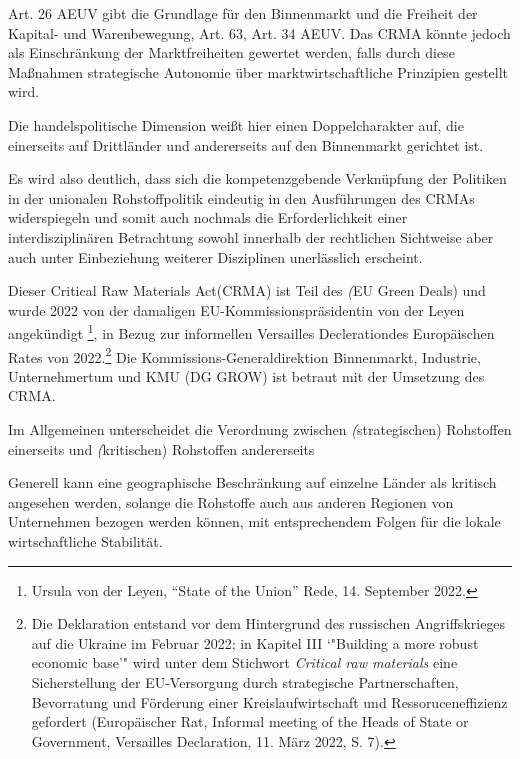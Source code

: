 \documentclass[12pt,a4paper,oneside]{book} %
\begin{document}
	 Art. 26 AEUV gibt die Grundlage für den Binnenmarkt und die Freiheit der Kapital- und Warenbewegung, Art. 63, Art. 34 AEUV. Das CRMA könnte jedoch als Einschränkung der Marktfreiheiten gewertet werden, falls durch diese Maßnahmen strategische Autonomie über marktwirtschaftliche Prinzipien gestellt wird.
	
	
	Die handelspolitische Dimension weißt hier einen Doppelcharakter auf, die einerseits auf Drittländer und andererseits auf den Binnenmarkt gerichtet ist.\autocite{Paschke, Rdtw 2024, 206, 211f}
	
	
	Es wird also deutlich, dass sich die kompetenzgebende Verknüpfung der Politiken in der unionalen Rohstoffpolitik eindeutig in den Ausführungen des CRMAs widerspiegeln und somit auch nochmals die Erforderlichkeit einer interdisziplinären Betrachtung sowohl innerhalb der rechtlichen Sichtweise aber auch unter Einbeziehung weiterer Disziplinen unerlässlich erscheint. 
	
	
	Dieser \glqq Critical Raw Materials Act\grqq (CRMA) ist Teil des \textit(EU Green Deals) und wurde 2022 von der damaligen EU-Kommissionspräsidentin von der Leyen angekündigt \footnote{Ursula von der Leyen, "`State of the Union"' Rede, 14. September 2022.}, in Bezug zur informellen \glqq Versailles Decleration\grqq des Europäischen Rates von 2022.\footnote{Die Deklaration entstand vor dem Hintergrund des russischen Angriffskrieges auf die Ukraine im Februar 2022; in Kapitel III `"Building a more robust economic base'" wird unter dem Stichwort \textit{Critical raw materials} eine Sicherstellung der EU-Versorgung durch strategische Partnerschaften, Bevorratung und Förderung einer Kreislaufwirtschaft und Ressoruceneffizienz gefordert (Europäischer Rat, Informal meeting of the Heads of State or Government, Versailles Declaration, 11. März 2022, S. 7).} Die Kommissions-Generaldirektion Binnenmarkt, Industrie, Unternehmertum und KMU (DG GROW) ist betraut mit der Umsetzung des CRMA.
	
	Im Allgemeinen unterscheidet die Verordnung zwischen \textit(strategischen) Rohstoffen einerseits und \textit(kritischen) Rohstoffen andererseits
	
	Generell kann eine geographische Beschränkung auf einzelne Länder als kritisch angesehen werden, solange die Rohstoffe auch aus anderen Regionen von Unternehmen bezogen werden können, mit entsprechendem Folgen für die lokale wirtschaftliche Stabilität.\autocite[s. hierzu]{ruettinger_doddfrank_2015}
	
\end{document}
